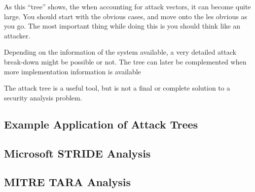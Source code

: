 As this ``tree'' shows, the when accounting for attack vectors, it can become quite large.
You should start with the obvious cases, and move onto the les obvious as you go.
The most important thing while doing this is you should think like an attacker.

\begin{remark*}
  Depending on the information of the system available, a very detailed attack break-down might be possible or not. The tree can later be complemented when more implementation information is available
\end{remark*}

\begin{remark*}
  The attack tree is a useful tool, but is not a final or complete solution to a security analysis problem.
\end{remark*}

\subsection{Example Application of Attack Trees}\label{subsec:Attack_Tree_Example}

\subsection{Microsoft STRIDE Analysis}\label{subsec:STRIDE_Analysis}

\subsection{MITRE TARA Analysis}\label{subsec:TARA_Analysis}

